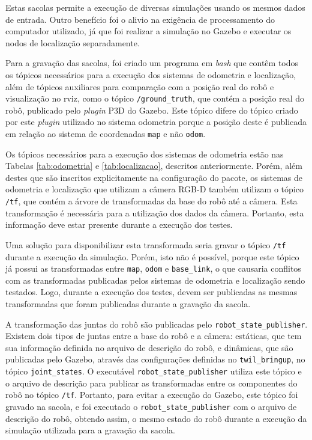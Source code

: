 \documentclass[repeatfields,xlists,xpacks,oneside,yearsonly]{ufrgscca}
\begin{document}
Estas sacolas permite a execução de diversas simulações usando os
mesmos dados de entrada. Outro benefício foi o alivio na exigência de
processamento do computador utilizado, já que foi realizar a
simulação no Gazebo e executar os nodos de localização separadamente.

Para a gravação das sacolas, foi criado um programa em \textit{bash}
que contêm todos os tópicos necessários para a execução dos sistemas
de odometria e localização, além de tópicos auxiliares para
comparação com a posição real do robô e visualização no rviz, como o
tópico \texttt{/ground\_truth}, que contém a posição real do robô,
publicado pelo \textit{plugin} P3D do Gazebo. Este tópico difere do
tópico criado por este \textit{plugin} utilizado no sistema odometria
porque a posição deste é publicada em relação ao sistema de
coordenadas \texttt{map} e não \texttt{odom}.

Os tópicos necessários para a execução dos sistemas de odometria
estão nas Tabelas \ref{tab:odometria} e \ref{tab:localizacao},
descritos anteriormente. Porém, além destes que são inscritos
explicitamente na configuração do pacote, os sistemas de odometria e
localização que utilizam a câmera RGB-D também utilizam o tópico
\texttt{/tf}, que contém a árvore de transformadas da base do robô
até a câmera. Esta transformação é necessária para a utilização dos
dados da câmera. Portanto, esta informação deve estar presente
durante a execução dos testes.

Uma solução para disponibilizar esta transformada seria gravar o
tópico \texttt{/tf} durante a execução da simulação. Porém, isto não
é possível, porque este tópico já possui as transformadas entre
\texttt{map}, \texttt{odom} e \texttt{base\_link}, o que causaria
conflitos com as transformadas publicadas pelos sistemas de odometria
e localização sendo testados. Logo, durante a execução dos testes,
devem ser publicadas as mesmas transformadas que foram publicadas
durante a gravação da sacola.

A transformação das juntas do robô são publicadas pelo
\texttt{robot\_state\_publisher}. Existem dois tipos de juntas entre
a base do robô e a câmera: estáticas, que tem sua informação definida
no arquivo de descrição do robô, e dinâmicas, que são publicadas pelo
Gazebo, através das configurações definidas no
\texttt{twil\_bringup}, no tópico \texttt{joint\_states}. O
executável \texttt{robot\_state\_publisher} utiliza este tópico e o
arquivo de descrição para publicar as transformadas entre os
componentes do robô no tópico \texttt{/tf}. Portanto, para evitar a
execução do Gazebo, este tópico foi gravado na sacola, e foi
executado o \texttt{robot\_state\_publisher} com o arquivo de
descrição do robô, obtendo assim, o mesmo estado do robô durante a
execução da simulação utilizada para a gravação da sacola.
\end{document}
